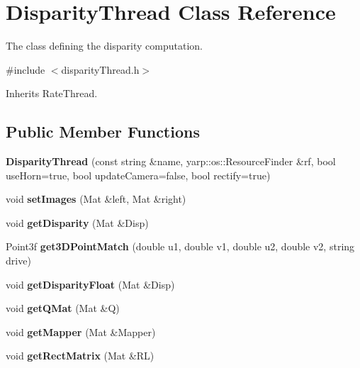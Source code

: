 \section{Disparity\+Thread Class Reference}
\label{classDisparityThread}


The class defining the disparity computation.  




{\ttfamily \#include $<$disparity\+Thread.\+h$>$}



Inherits Rate\+Thread.

\subsection*{Public Member Functions}
\begin{DoxyCompactItemize}
\item 
{\bfseries Disparity\+Thread} (const string \&name, yarp\+::os\+::\+Resource\+Finder \&rf, bool use\+Horn=true, bool update\+Camera=false, bool rectify=true)\label{classDisparityThread_ab53d3046d1397fb7c0eef512e1aae683}

\item 
void {\bfseries set\+Images} (Mat \&left, Mat \&right)\label{classDisparityThread_a91ce8f5117613ee0863fa21b0f1347b4}

\item 
void {\bfseries get\+Disparity} (Mat \&Disp)\label{classDisparityThread_a9d7c5ff0ddc84fbc74f78e6bc77c8297}

\item 
Point3f {\bfseries get3\+D\+Point\+Match} (double u1, double v1, double u2, double v2, string drive)\label{classDisparityThread_ae499c13ea55662aa612781d0d7488741}

\item 
void {\bfseries get\+Disparity\+Float} (Mat \&Disp)\label{classDisparityThread_aadcaf0193ce0c9418392803c77725efc}

\item 
void {\bfseries get\+Q\+Mat} (Mat \&Q)\label{classDisparityThread_a0c5d331cc596e81ba9bfb67770a67fa7}

\item 
void {\bfseries get\+Mapper} (Mat \&Mapper)\label{classDisparityThread_af7d1aee791ada6fdf79be8bf8e40e260}

\item 
void {\bfseries get\+Rect\+Matrix} (Mat \&RL)\label{classDisparityThread_a0c0b139ecaf7fa43a63ce6610c184288}


\end{DoxyCompactItemize}
